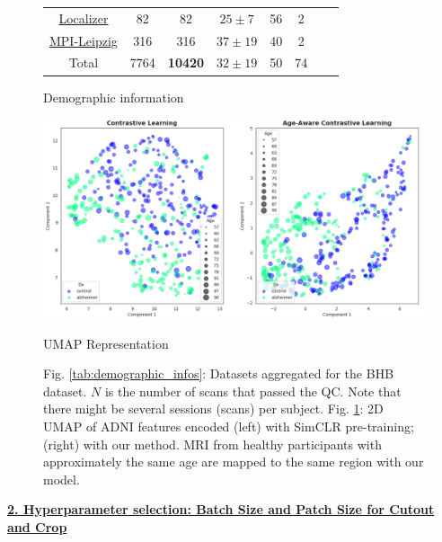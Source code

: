 \documentclass[runningheads]{llncs}
\begin{document}
\begin{figure}[h!]
\begin{minipage}[c]{.40\linewidth}
{\begin{tabular}{|c|c|c|c|c|c|c|c|}
            \href{http://brainomics.cea.fr/localizer/localizer}{Localizer} & 82 & 82 & $25 \pm 7$ & 56 & 2\\
            \href{https://openneuro.org/datasets/ds000221/versions/00002}{MPI-Leipzig} & 316 & 316 & $37 \pm 19$ & 40 & 2\\
            \hline 
            \hline
            Total & 7764 & \textbf{10420} & $32 \pm 19$ & 50 & 74 \\
            \hline
        \end{tabular}
        }
        \caption{Demographic information}
        \label{tab:demographic_infos}
    \end{minipage}
    \begin{minipage}[c]{.59\linewidth}
        \centering
        \includegraphics[width=\textwidth]{UMAP_contrastive-age-aware.png}
        \caption{UMAP Representation}
        \label{fig:2D_umap}
    \end{minipage}
    
    \caption*{Fig. \ref{tab:demographic_infos}: Datasets aggregated for the BHB dataset. $N$ is the number of scans that passed the QC. Note that there might be several sessions (scans) per subject. Fig. \ref{fig:2D_umap}: 2D UMAP of ADNI features encoded (left) with SimCLR pre-training; (right) with our method. MRI from healthy participants with approximately the same age are mapped to the same region with our model. }
\end{figure}
\justify
\underline{\textbf{2. Hyperparameter selection: Batch Size and Patch Size for Cutout and Crop}}
\label{supp_hyperparams}

\end{document}
